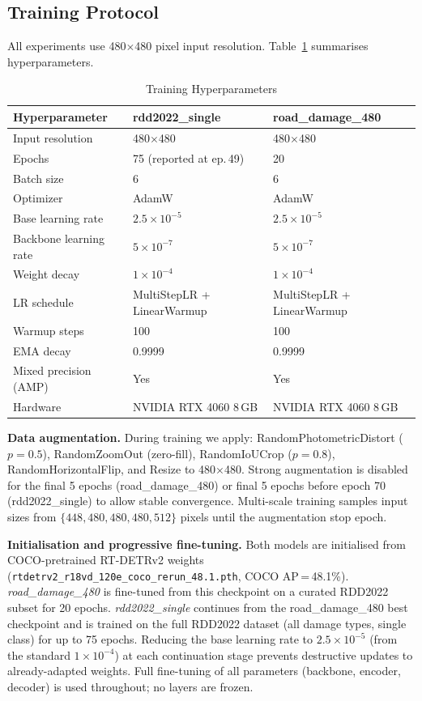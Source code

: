\documentclass[conference]{IEEEtran}
\begin{document}
\subsection{Training Protocol}

All experiments use 480$\times$480 pixel input resolution.
Table~\ref{tab:training} summarises hyperparameters.

\begin{table}[h]
\caption{Training Hyperparameters}
\label{tab:training}
\centering
\begin{tabular}{lll}
\toprule
\textbf{Hyperparameter} & \textbf{rdd2022\_single} & \textbf{road\_damage\_480} \\
\midrule
Input resolution        & 480$\times$480 & 480$\times$480 \\
Epochs                  & 75 (reported at ep.\,49) & 20 \\
Batch size              & 6 & 6 \\
Optimizer               & AdamW & AdamW \\
Base learning rate      & $2.5 \times 10^{-5}$ & $2.5 \times 10^{-5}$ \\
Backbone learning rate  & $5 \times 10^{-7}$ & $5 \times 10^{-7}$ \\
Weight decay            & $1 \times 10^{-4}$ & $1 \times 10^{-4}$ \\
LR schedule             & MultiStepLR + LinearWarmup & MultiStepLR + LinearWarmup \\
Warmup steps            & 100 & 100 \\
EMA decay               & 0.9999 & 0.9999 \\
Mixed precision (AMP)   & Yes & Yes \\
Hardware                & NVIDIA RTX 4060 8\,GB & NVIDIA RTX 4060 8\,GB \\
\bottomrule
\end{tabular}
\end{table}

\textbf{Data augmentation.}
During training we apply: RandomPhotometricDistort ($p=0.5$), RandomZoomOut
(zero-fill), RandomIoUCrop ($p=0.8$), RandomHorizontalFlip, and Resize to
480$\times$480.
Strong augmentation is disabled for the final 5 epochs (road\_damage\_480) or final
5 epochs before epoch 70 (rdd2022\_single) to allow stable convergence.
Multi-scale training samples input sizes from $\{448, 480, 480, 480, 512\}$ pixels
until the augmentation stop epoch.

\textbf{Initialisation and progressive fine-tuning.}
Both models are initialised from COCO-pretrained RT-DETRv2 weights
(\texttt{rtdetrv2\_r18vd\_120e\_coco\_rerun\_48.1.pth}, COCO AP\,=\,48.1\%).
\textit{road\_damage\_480} is fine-tuned from this checkpoint on a curated RDD2022
subset for 20 epochs.
\textit{rdd2022\_single} continues from the road\_damage\_480 best checkpoint and is
trained on the full RDD2022 dataset (all damage types, single class) for up to 75
epochs.
Reducing the base learning rate to $2.5 \times 10^{-5}$ (from the standard
$1 \times 10^{-4}$) at each continuation stage prevents destructive updates to
already-adapted weights.
Full fine-tuning of all parameters (backbone, encoder, decoder) is used throughout;
no layers are frozen.
\end{document}
